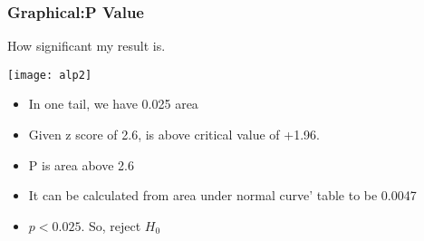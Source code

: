 \begin{frame}
\frametitle{Graphical:P Value}
How significant my result is.
\begin{center}
\texttt{[image: alp2]}
\end{center}

\begin{itemize}
\item  In one tail, we have 0.025 area
\item Given z score of 2.6, is above critical value of +1.96.
\item P is area above 2.6
\item It can be calculated from area under normal curve' table to be 0.0047
\item $ p < 0.025$. So, reject $H_0$
\end{itemize}
\end{frame}
